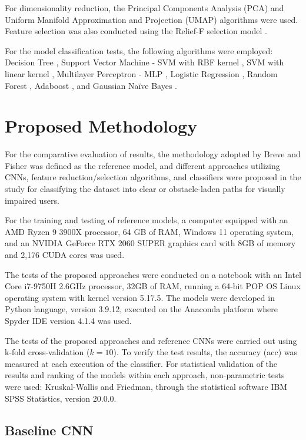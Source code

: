 \documentclass[preprint,12pt]{elsarticle}
\begin{document}
For dimensionality reduction, the Principal Components Analysis (PCA) \cite{jolliffe2002} and Uniform Manifold Approximation and Projection (UMAP) \cite{mcinnes2021} algorithms were used. Feature selection was also conducted using the Relief-F selection model \cite{kononenko1994}.

For the model classification tests, the following algorithms were employed: Decision Tree \cite{priyanka2020}, Support Vector Machine - SVM with RBF kernel \cite{liu2011}, SVM with linear kernel \cite{lorena2003}, Multilayer Perceptron - MLP \cite{pereira2013}, Logistic Regression \cite{ekstrom2018}, Random Forest \cite{breiman2001}, Adaboost \cite{zhu2009}, and Gaussian Naïve Bayes \cite{gayathri2016}.

\section{Proposed Methodology}

For the comparative evaluation of results, the methodology adopted by Breve and Fisher \cite{breve2020} was defined as the reference model, and different approaches utilizing CNNs, feature reduction/selection algorithms, and classifiers were proposed in the study for classifying the dataset into clear or obstacle-laden paths for visually impaired users.

For the training and testing of reference models, a computer equipped with an AMD Ryzen 9 3900X processor, 64 GB of RAM, Windows 11 operating system, and an NVIDIA GeForce RTX 2060 SUPER graphics card with 8GB of memory and 2,176 CUDA cores was used.

The tests of the proposed approaches were conducted on a notebook with an Intel Core i7-9750H 2.6GHz processor, 32GB of RAM, running a 64-bit POP OS Linux operating system with kernel version 5.17.5. The models were developed in Python language, version 3.9.12, executed on the Anaconda platform where Spyder IDE version 4.1.4 was used.

The tests of the proposed approaches and reference CNNs were carried out using k-fold cross-validation ($k=10$). To verify the test results, the accuracy (acc) was measured at each execution of the classifier. For statistical validation of the results and ranking of the models within each approach, non-parametric tests were used: Kruskal-Wallis and Friedman, through the statistical software IBM SPSS Statistics, version 20.0.0.

\subsection{Baseline CNN}
\end{document}

